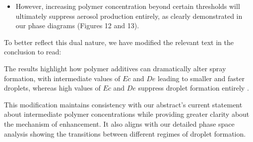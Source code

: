 \documentclass[]{article}
\newcommand{\oo}{\color{magenta} \normalfont}
\newcommand{\bb}{\color{black} \normalfont}
\begin{document}
\begin{enumerate}
\begin{itemize}
    	\item However, increasing polymer concentration beyond certain thresholds will ultimately suppress aerosol production entirely, as clearly demonstrated in our phase diagrams (Figures 12 and 13).
    \end{itemize}

    To better reflect this dual nature, we have modified the relevant text in the conclusion to read:

	\oo
	The results highlight how polymer additives can dramatically alter spray formation, with intermediate values of $Ec$ and $De$ leading to smaller and faster droplets, whereas high values of $Ec$ and $De$ suppress droplet formation entirely \citep{kant2023bag}.
	\bb

	This modification maintains consistency with our abstract's current statement about intermediate polymer concentrations while providing greater clarity about the mechanism of enhancement. It also aligns with our detailed phase space analysis showing the transitions between different regimes of droplet formation.


\end{enumerate}

\printbibliography
\end{document}
